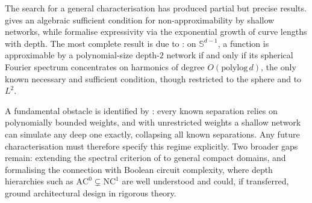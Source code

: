 \documentclass[10pt]{article}
\begin{document}
The search for a general characterisation has produced partial but precise results.
\citet{daniely17} gives an algebraic sufficient condition for non-approximability by shallow
networks, while \citet{raghu17} formalise expressivity via the exponential growth of curve
lengths with depth. The most complete result is due to \citet{diakonikolas22}: on
$\mathbb{S}^{d-1}$, a function is approximable by a polynomial-size depth-$2$ network if and
only if its spherical Fourier spectrum concentrates on harmonics of degree
$O(\mathrm{polylog}\,d)$, the only known necessary and sufficient condition, though
restricted to the sphere and to $L^2$.

A fundamental obstacle is identified by \citet{vardi20}: every known separation relies on
polynomially bounded weights, and with unrestricted weights a shallow network can simulate any
deep one exactly, collapsing all known separations. Any future characterisation must therefore
specify this regime explicitly. Two broader gaps remain: extending the spectral criterion of
\citet{diakonikolas22} to general compact domains, and formalising the connection with Boolean
circuit complexity, where depth hierarchies such as $\mathrm{AC}^0\subsetneq\mathrm{NC}^1$ are
well understood and could, if transferred, ground architectural design in rigorous theory.



\end{document}
